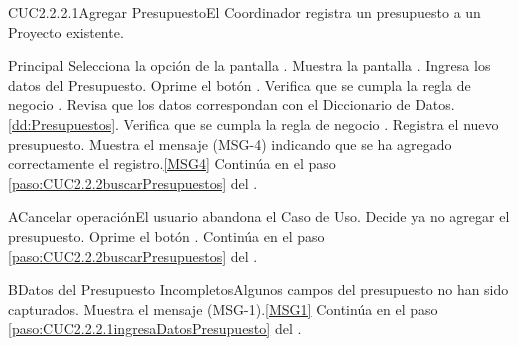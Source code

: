 	\begin{UseCase}{CUC2.2.2.1}{Agregar Presupuesto}{El Coordinador registra un presupuesto a un Proyecto existente.}
	\end{UseCase}

	\begin{UCtrayectoria}{Principal}
			\UCpaso[\UCactor] Selecciona la opción  de la pantalla .
			\UCpaso Muestra la pantalla .
			\UCpaso [\UCactor] Ingresa los datos del Presupuesto. \label{paso:CUC2.2.2.1ingresaDatosPresupuesto}
			\UCpaso [\UCactor] Oprime el botón .
			\UCpaso Verifica que se cumpla la regla de negocio .  
			\UCpaso Revisa que los datos correspondan con el Diccionario de Datos. \ref{dd:Presupuestos}. 
			\UCpaso Verifica que se cumpla la regla de negocio .  
			\UCpaso Registra el nuevo presupuesto.
			\UCpaso Muestra el mensaje (MSG-4) indicando que se ha agregado correctamente el registro.\ref{MSG4}
			\UCpaso Continúa en el paso \ref{paso:CUC2.2.2buscarPresupuestos} del .
	\end{UCtrayectoria}

	\begin{UCtrayectoriaA}{A}{Cancelar operación}{El usuario abandona el Caso de Uso.}
			\UCpaso[\UCactor] Decide ya no agregar el presupuesto.
			\UCpaso[\UCactor] Oprime el botón .
			\UCpaso Continúa en el paso \ref{paso:CUC2.2.2buscarPresupuestos} del .
	\end{UCtrayectoriaA}
		
	\begin{UCtrayectoriaA}{B}{Datos del Presupuesto Incompletos}{Algunos campos del presupuesto no han sido capturados.}
			\UCpaso Muestra el mensaje (MSG-1).\ref{MSG1}
			\UCpaso Continúa en el paso \ref{paso:CUC2.2.2.1ingresaDatosPresupuesto} del .
	\end{UCtrayectoriaA}

